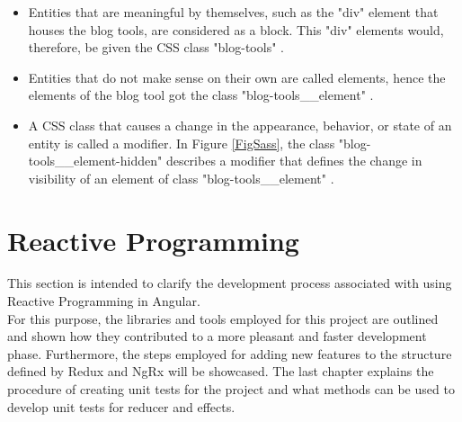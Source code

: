 \documentclass[Bachelor,BIF,english]{twbook}
\begin{document}
\begin{itemize}
\item Entities that are meaningful by themselves, such as the "div" element that houses the blog tools, are considered as a block. This "div" elements would, therefore, be given the CSS class "blog-tools" \cite{BEMNaming}.
\item Entities that do not make sense on their own are called elements, hence the elements of the blog tool got the class "blog-tools\_\_element" \cite{BEMNaming}.
\item A CSS class that causes a change in the appearance, behavior, or state of an entity is called a modifier. In Figure \ref{FigSass}, the class "blog-tools\_\_element-hidden" describes a modifier that defines the change in visibility of an element of class "blog-tools\_\_element" \cite{BEMNaming}.
\end{itemize}


\section{Reactive Programming}
This section is intended to clarify the development process associated with using Reactive Programming in Angular.
\\[\baselineskip]
For this purpose, the libraries and tools employed for this project are outlined and shown how they contributed to a more pleasant and faster development phase. Furthermore, the steps employed for adding new features to the structure defined by Redux and NgRx will be showcased. The last chapter explains the procedure of creating unit tests for the project and what methods can be used to develop unit tests for reducer and effects.
\end{document}
